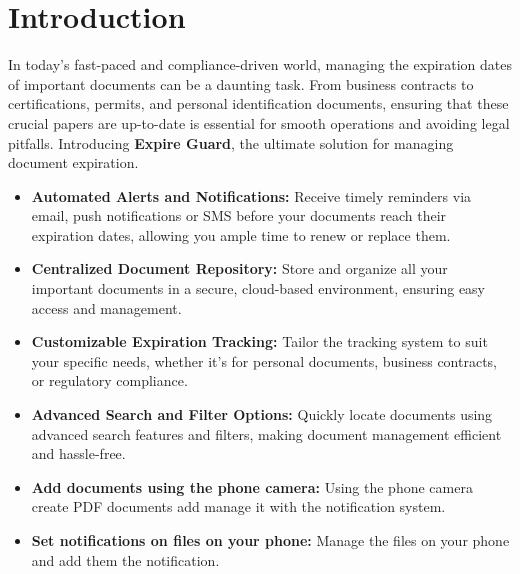 \section{Introduction}
In today's fast-paced and compliance-driven world, managing the expiration dates of important documents can be a daunting task. From business contracts to certifications, permits, and personal identification documents, ensuring that these crucial papers are up-to-date is essential for smooth operations and avoiding legal pitfalls. Introducing \textbf{Expire Guard}, the ultimate solution for managing document expiration.

\begin{itemize}
	\item \textbf{Automated Alerts and Notifications:} Receive timely reminders via email, push notifications or SMS before your documents reach their expiration dates, allowing you ample time to renew or replace them.
	\item \textbf{Centralized Document Repository:} Store and organize all your important documents in a secure, cloud-based environment, ensuring easy access and management.
	\item \textbf{Customizable Expiration Tracking:} Tailor the tracking system to suit your specific needs, whether it's for personal documents, business contracts, or regulatory compliance.
	\item \textbf{Advanced Search and Filter Options:} Quickly locate documents using advanced search features and filters, making document management efficient and hassle-free.
	\item \textbf{Add documents using the phone camera: }Using the phone camera create PDF documents add manage it with the notification system.
	\item \textbf{Set notifications on files on your phone: }Manage the files on your phone and add them the notification.
\end{itemize}